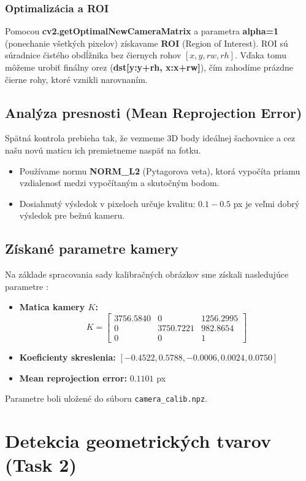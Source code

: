 \documentclass[a4paper, 12pt]{article}
\begin{document}
\subsubsection*{Optimalizácia a ROI}
Pomocou \textbf{cv2.getOptimalNewCameraMatrix} a parametra \textbf{alpha=1} (ponechanie všetkých pixelov) získavame \textbf{ROI} (Region of Interest). \newline ROI sú súradnice čistého obdĺžnika bez čiernych rohov $[x, y, rw, rh]$.
Vďaka tomu môžeme urobiť finálny orez (\textbf{dst[y:y+rh, x:x+rw]}), čím zahodíme prázdne čierne rohy, ktoré vznikli narovnaním.

\subsection{Analýza presnosti (Mean Reprojection Error)}
Spätná kontrola prebieha tak, že vezmeme 3D body ideálnej šachovnice a cez našu novú maticu ich premietneme naspäť na fotku.
\begin{itemize}
    \item Používame normu \textbf{NORM\_L2} (Pytagorova veta), ktorá vypočíta priamu vzdialenosť medzi vypočítaným a skutočným bodom.
    \item Dosiahnutý výsledok v pixeloch určuje kvalitu: $0.1 - 0.5$ px je veľmi dobrý výsledok pre bežnú kameru.
\end{itemize}
\subsection{Získané parametre kamery}
Na základe spracovania sady kalibračných obrázkov sme získali nasledujúce parametre :

\begin{itemize}
    \item \textbf{Matica kamery $K$:}
    \[
    K = \begin{bmatrix}
    3756.5840 & 0 & 1256.2995 \\
    0 & 3750.7221 & 982.8654 \\
    0 & 0 & 1
    \end{bmatrix}
    \]
    \item \textbf{Koeficienty skreslenia:}
    $[-0.4522, 0.5788, -0.0006, 0.0024, 0.0750]$
    \item \textbf{Mean reprojection error:} $0.1101$ px
\end{itemize}
Parametre boli uložené do súboru \texttt{camera\_calib.npz}.

\newpage
\section{Detekcia geometrických tvarov (Task 2)}
\end{document}
